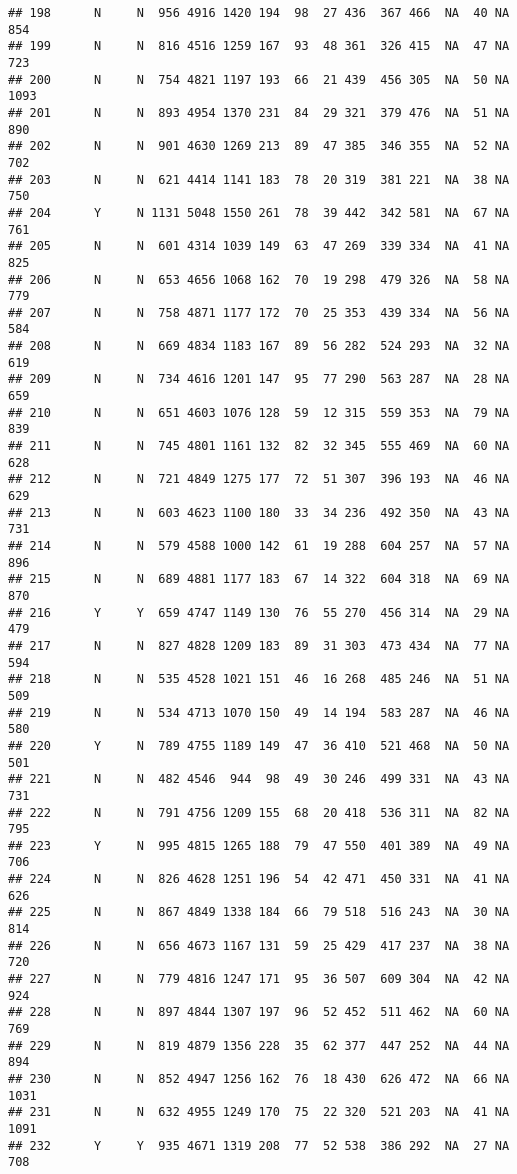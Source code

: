 \documentclass[]{article}
\begin{document}
\begin{verbatim}
## 198      N     N  956 4916 1420 194  98  27 436  367 466  NA  40 NA  854
## 199      N     N  816 4516 1259 167  93  48 361  326 415  NA  47 NA  723
## 200      N     N  754 4821 1197 193  66  21 439  456 305  NA  50 NA 1093
## 201      N     N  893 4954 1370 231  84  29 321  379 476  NA  51 NA  890
## 202      N     N  901 4630 1269 213  89  47 385  346 355  NA  52 NA  702
## 203      N     N  621 4414 1141 183  78  20 319  381 221  NA  38 NA  750
## 204      Y     N 1131 5048 1550 261  78  39 442  342 581  NA  67 NA  761
## 205      N     N  601 4314 1039 149  63  47 269  339 334  NA  41 NA  825
## 206      N     N  653 4656 1068 162  70  19 298  479 326  NA  58 NA  779
## 207      N     N  758 4871 1177 172  70  25 353  439 334  NA  56 NA  584
## 208      N     N  669 4834 1183 167  89  56 282  524 293  NA  32 NA  619
## 209      N     N  734 4616 1201 147  95  77 290  563 287  NA  28 NA  659
## 210      N     N  651 4603 1076 128  59  12 315  559 353  NA  79 NA  839
## 211      N     N  745 4801 1161 132  82  32 345  555 469  NA  60 NA  628
## 212      N     N  721 4849 1275 177  72  51 307  396 193  NA  46 NA  629
## 213      N     N  603 4623 1100 180  33  34 236  492 350  NA  43 NA  731
## 214      N     N  579 4588 1000 142  61  19 288  604 257  NA  57 NA  896
## 215      N     N  689 4881 1177 183  67  14 322  604 318  NA  69 NA  870
## 216      Y     Y  659 4747 1149 130  76  55 270  456 314  NA  29 NA  479
## 217      N     N  827 4828 1209 183  89  31 303  473 434  NA  77 NA  594
## 218      N     N  535 4528 1021 151  46  16 268  485 246  NA  51 NA  509
## 219      N     N  534 4713 1070 150  49  14 194  583 287  NA  46 NA  580
## 220      Y     N  789 4755 1189 149  47  36 410  521 468  NA  50 NA  501
## 221      N     N  482 4546  944  98  49  30 246  499 331  NA  43 NA  731
## 222      N     N  791 4756 1209 155  68  20 418  536 311  NA  82 NA  795
## 223      Y     N  995 4815 1265 188  79  47 550  401 389  NA  49 NA  706
## 224      N     N  826 4628 1251 196  54  42 471  450 331  NA  41 NA  626
## 225      N     N  867 4849 1338 184  66  79 518  516 243  NA  30 NA  814
## 226      N     N  656 4673 1167 131  59  25 429  417 237  NA  38 NA  720
## 227      N     N  779 4816 1247 171  95  36 507  609 304  NA  42 NA  924
## 228      N     N  897 4844 1307 197  96  52 452  511 462  NA  60 NA  769
## 229      N     N  819 4879 1356 228  35  62 377  447 252  NA  44 NA  894
## 230      N     N  852 4947 1256 162  76  18 430  626 472  NA  66 NA 1031
## 231      N     N  632 4955 1249 170  75  22 320  521 203  NA  41 NA 1091
## 232      Y     Y  935 4671 1319 208  77  52 538  386 292  NA  27 NA  708

\end{verbatim}
\end{document}
